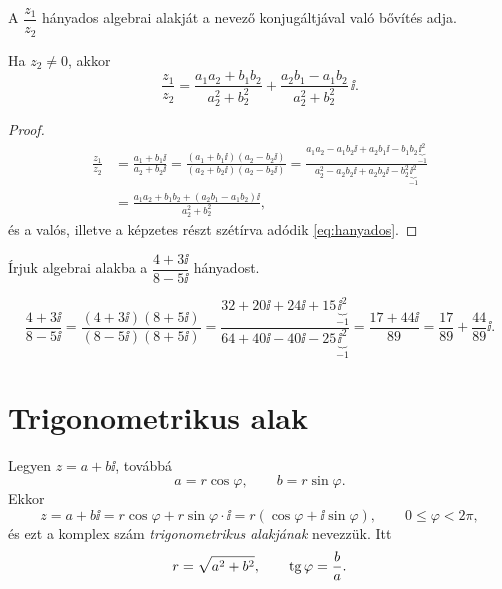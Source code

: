 \documentclass[11pt]{article}
\begin{document}
A $\dfrac{z_{1}}{z_{2}}$ hányados algebrai alakját a nevező konjugáltjával való bővítés adja.

\begin{thmbox}
\begin{proposition}
Ha $z_{2}\neq 0$, akkor
\begin{equation}\label{eq:hanyados}
\frac{z_{1}}{z_{2}}=\frac{a_{1}a_{2}+b_{1}b_{2}}{a_{2}^{2}+b_{2}^{2}}
+\frac{a_{2}b_{1}-a_{1}b_{2}}{a_{2}^{2}+b_{2}^{2}}\,\ii .
\end{equation}
\end{proposition}
\end{thmbox}
\begin{proof}
\begin{align*}
\frac{z_{1}}{z_{2}}&=\frac{a_{1}+b_{1}\ii}{a_{2}+b_{2}\ii}
=\frac{(a_{1}+b_{1}\ii)(a_{2}-b_{2}\ii)}{(a_{2}+b_{2}\ii)(a_{2}-b_{2}\ii)}
=\frac{a_{1}a_{2}-a_{1}b_{2}\ii+a_{2}b_{1}\ii-b_{1}b_{2}\underbrace{\ii^{2}}_{-1}}
{a_{2}^{2}-a_{2}b_{2}\ii+a_{2}b_{2}\ii-b_{2}^{2}\underbrace{\ii^{2}}_{-1}}\\[0.6em]
&=\frac{a_{1}a_{2}+b_{1}b_{2}+(a_{2}b_{1}-a_{1}b_{2})\ii}{a_{2}^{2}+b_{2}^{2}},
\end{align*}
és a valós, illetve a képzetes részt szétírva adódik \eqref{eq:hanyados}.
\end{proof}

\begin{exbox}
\begin{example}
Írjuk algebrai alakba a $\dfrac{4+3\ii}{8-5\ii}$ hányadost.
\end{example}
\end{exbox}
\begin{solution}
\[
\frac{4+3\ii}{8-5\ii}=\frac{(4+3\ii)(8+5\ii)}{(8-5\ii)(8+5\ii)}
=\frac{32+20\ii+24\ii+15\underbrace{\ii^{2}}_{-1}}{64+40\ii-40\ii-25\underbrace{\ii^{2}}_{-1}}
=\frac{17+44\ii}{89}=\frac{17}{89}+\frac{44}{89}\ii .
\]
\end{solution}

\section{Trigonometrikus alak}

\begin{defbox}
\begin{definition}
Legyen $z=a+b\ii$, továbbá
\[
a=r\cos\varphi,\qquad b=r\sin\varphi .
\]
Ekkor
\[
z=a+b\ii=r\cos\varphi+r\sin\varphi\cdot \ii=r(\cos\varphi+\ii\sin\varphi),
\qquad 0\le\varphi<2\pi,
\]
és ezt a komplex szám \emph{trigonometrikus alakjának} nevezzük. Itt
\[
r=\sqrt{a^{2}+b^{2}},\qquad \operatorname{tg}\varphi=\frac{b}{a}.
\]
\end{definition}
\end{defbox}
\end{document}
